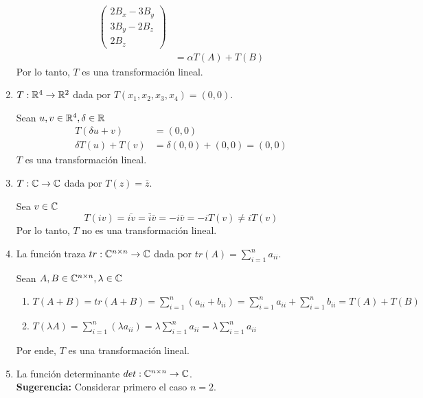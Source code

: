 \begin{enumerate}
\begin{mdframed}[style=s]
\begin{align*}
\begin{pmatrix}
                        2B_x-3B_y\\3B_y-2B_z\\2B_z
                    \end{pmatrix}\\
                    &=\alpha T(A)+T(B)
                \end{align*}
                Por lo tanto, $T$ es una transformación lineal.
            \end{mdframed}
        \item $T:\mathbb{R}^4\to\mathbb{R}^2$ dada por $T(x_1,x_2,x_3,x_4)=(0,0)$.
            \begin{mdframed}[style=s]
                Sean $u,v\in\mathbb{R}^4,\delta\in\mathbb{R}$
                \begin{align*}
                    T(\delta u+v)&=(0,0)\\
                    \delta T(u)+T(v)&=\delta(0,0)+(0,0)=(0,0)
                \end{align*}
                $T$ es una transformación lineal.
            \end{mdframed}
        \item $T:\mathbb{C}\to\mathbb{C}$ dada por $T(z)=\bar{z}$.
            \begin{mdframed}[style=s]
                Sea $v\in\mathbb{C}$\[T(iv)=\overline{iv}=\bar{i}\bar{v}=-i\bar{v}=-iT(v)\neq iT(v)\]
                Por lo tanto, $T$ no es una transformación lineal.
            \end{mdframed}
        \item La función traza $tr:\mathbb{C}^{n\times n}\to\mathbb{C}$ dada por $tr(A)=\displaystyle\sum_{i=1}^na_{ii}$.
            \begin{mdframed}[style=s]
                Sean $A,B\in\mathbb{C}^{n\times n},\lambda\in\mathbb{C}$
                \begin{enumerate}
                    \item $T(A+B)=tr(A+B)=\sum_{i=1}^n(a_{ii}+b_{ii})=\sum_{i=1}^na_{ii}+\sum_{i=1}^nb_{ii}=T(A)+T(B)$
                    \item $T(\lambda A)=\sum_{i=1}^n(\lambda a_{ii})=\lambda\sum_{i=1}^na_{ii}=\lambda\sum_{i=1}^na_{ii}$
                \end{enumerate}
                Por ende, $T$ es una transformación lineal.
            \end{mdframed}
        \item La función determinante $det:\mathbb{C}^{n\times n}\to \mathbb{C}$.\\
            \textbf{Sugerencia:} Considerar primero el caso $n=2$.

\end{enumerate}
